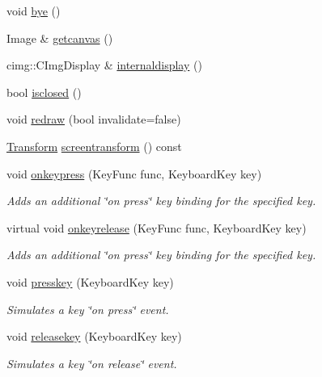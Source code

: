 \begin{DoxyCompactItemize}
\item 
void \hyperlink{classcturtle_1_1InteractiveTurtleScreen_a045b2cc0c8869140015abcc11226a714}{bye} ()
\item 
Image \& \hyperlink{classcturtle_1_1InteractiveTurtleScreen_ad2156553b1af3d0ab4527d8ddbda5d61}{getcanvas} ()
\item 
cimg\+::\+C\+Img\+Display \& \hyperlink{classcturtle_1_1InteractiveTurtleScreen_a0ea57bab0cb93f0fa4629747bddbab30}{internaldisplay} ()
\item 
bool \hyperlink{classcturtle_1_1InteractiveTurtleScreen_ab1809a5a10cb3afaa330d6ba2ee5bb49}{isclosed} ()
\item 
void \hyperlink{classcturtle_1_1InteractiveTurtleScreen_ad0e307da3f48e9e1ce6660c975ca3854}{redraw} (bool invalidate=false)
\item 
\hyperlink{classcturtle_1_1Transform}{Transform} \hyperlink{classcturtle_1_1InteractiveTurtleScreen_a6c81f204488e1ebe8180504990e559dc}{screentransform} () const
\item 
void \hyperlink{classcturtle_1_1InteractiveTurtleScreen_a997c82f379c6c90e2f1d2336db8bc1fc}{onkeypress} (Key\+Func func, Keyboard\+Key key)
\begin{DoxyCompactList}\small\item\em Adds an additional \char`\"{}on press\char`\"{} key binding for the specified key. \end{DoxyCompactList}\item 
virtual void \hyperlink{classcturtle_1_1InteractiveTurtleScreen_a313943b2ae07b9a67ae0681fbadc2085}{onkeyrelease} (Key\+Func func, Keyboard\+Key key)
\begin{DoxyCompactList}\small\item\em Adds an additional \char`\"{}on press\char`\"{} key binding for the specified key. \end{DoxyCompactList}\item 
void \hyperlink{classcturtle_1_1InteractiveTurtleScreen_a4273782c35444bc35afb0a8ea0f6a168}{presskey} (Keyboard\+Key key)
\begin{DoxyCompactList}\small\item\em Simulates a key \char`\"{}on press\char`\"{} event. \end{DoxyCompactList}\item 
void \hyperlink{classcturtle_1_1InteractiveTurtleScreen_a31a3f4a793acd97e8e6e8a42a7c7c885}{releasekey} (Keyboard\+Key key)
\begin{DoxyCompactList}\small\item\em Simulates a key \char`\"{}on release\char`\"{} event. \end{DoxyCompactList}\item 

\end{DoxyCompactItemize}
